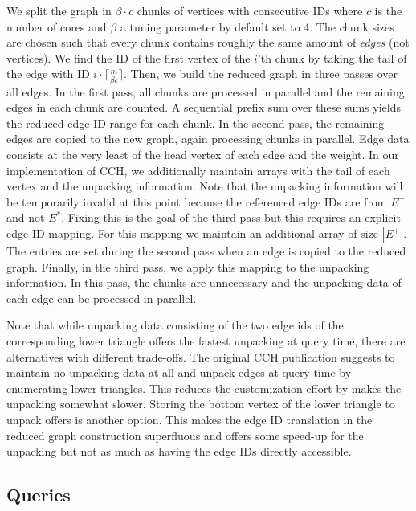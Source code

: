 \documentclass[a4paper, english, cleveref]{lipics-v2021}
\begin{document}
We split the graph in $\beta \cdot c$ chunks of vertices with consecutive IDs where $c$ is the number of cores and $\beta$ a tuning parameter by default set to 4.
The chunk sizes are chosen such that every chunk contains roughly the same amount of \emph{edges} (not vertices).
We find the ID of the first vertex of the $i$'th chunk by taking the tail of the edge with ID $i \cdot \lceil \frac{m}{\beta c} \rceil$.
Then, we build the reduced graph in three passes over all edges.
In the first pass, all chunks are processed in parallel and the remaining edges in each chunk are counted.
A sequential prefix sum over these sums yields the reduced edge ID range for each chunk.
In the second pass, the remaining edges are copied to the new graph, again processing chunks in parallel.
Edge data consists at the very least of the head vertex of each edge and the weight.
In our implementation of CCH, we additionally maintain arrays with the tail of each vertex and the unpacking information.
Note that the unpacking information will be temporarily invalid at this point because the referenced edge IDs are from $E^+$ and not $E^*$.
Fixing this is the goal of the third pass but this requires an explicit edge ID mapping.
For this mapping we maintain an additional array of size $|E^+|$.
The entries are set during the second pass when an edge is copied to the reduced graph.
Finally, in the third pass, we apply this mapping to the unpacking information.
In this pass, the chunks are unnecessary and the unpacking data of each edge can be processed in parallel.

Note that while unpacking data consisting of the two edge ids of the corresponding lower triangle offers the fastest unpacking at query time, there are alternatives with different trade-offs.
The original CCH publication suggests to maintain no unpacking data at all and unpack edges at query time by enumerating lower triangles.
This reduces the customization effort by makes the unpacking somewhat slower.
Storing the bottom vertex of the lower triangle to unpack offers is another option.
This makes the edge ID translation in the reduced graph construction superfluous and offers some speed-up for the unpacking but not as much as having the edge IDs directly accessible.

\subsection{Queries}
\end{document}

